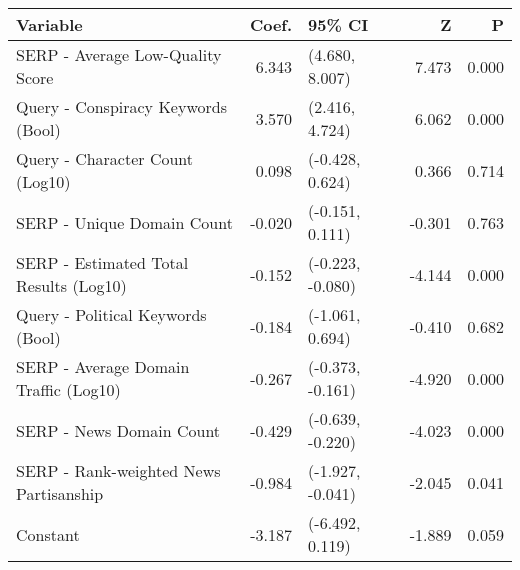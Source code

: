 \begin{tabular}{>{\raggedright\arraybackslash}p{7cm}rlrr}
\toprule
\textbf{Variable} & \textbf{Coef.} & \textbf{95\% CI} & \textbf{Z} & \textbf{P} \\
\midrule
SERP - Average Low-Quality Score & 6.343 & (4.680, 8.007) & 7.473 & 0.000 \\
Query - Conspiracy Keywords (Bool) & 3.570 & (2.416, 4.724) & 6.062 & 0.000 \\
Query - Character Count (Log10) & 0.098 & (-0.428, 0.624) & 0.366 & 0.714 \\
SERP - Unique Domain Count & -0.020 & (-0.151, 0.111) & -0.301 & 0.763 \\
SERP - Estimated Total Results (Log10) & -0.152 & (-0.223, -0.080) & -4.144 & 0.000 \\
Query - Political Keywords (Bool) & -0.184 & (-1.061, 0.694) & -0.410 & 0.682 \\
SERP - Average Domain Traffic (Log10) & -0.267 & (-0.373, -0.161) & -4.920 & 0.000 \\
SERP - News Domain Count & -0.429 & (-0.639, -0.220) & -4.023 & 0.000 \\
SERP - Rank-weighted News Partisanship & -0.984 & (-1.927, -0.041) & -2.045 & 0.041 \\
Constant & -3.187 & (-6.492, 0.119) & -1.889 & 0.059 \\
\bottomrule
\end{tabular}